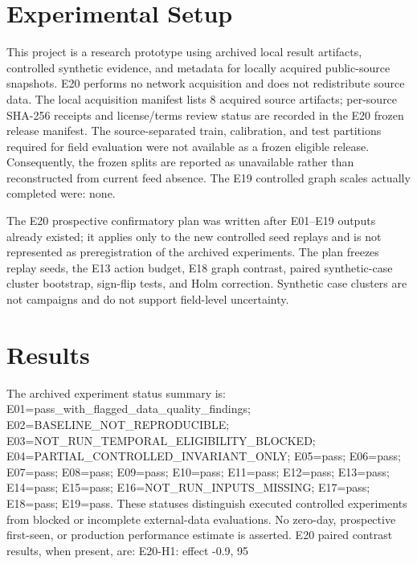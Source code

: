 \section{Experimental Setup}
This project is a research prototype using archived local result artifacts, controlled synthetic evidence, and metadata for locally acquired public-source snapshots. E20 performs no network acquisition and does not redistribute source data. The local acquisition manifest lists 8 acquired source artifacts; per-source SHA-256 receipts and license/terms review status are recorded in the E20 frozen release manifest. The source-separated train, calibration, and test partitions required for field evaluation were not available as a frozen eligible release. Consequently, the frozen splits are reported as unavailable rather than reconstructed from current feed absence. The E19 controlled graph scales actually completed were: none.

The E20 prospective confirmatory plan was written after E01--E19 outputs already existed; it applies only to the new controlled seed replays and is not represented as preregistration of the archived experiments. The plan freezes replay seeds, the E13 action budget, E18 graph contrast, paired synthetic-case cluster bootstrap, sign-flip tests, and Holm correction. Synthetic case clusters are not campaigns and do not support field-level uncertainty.

\section{Results}
The archived experiment status summary is: E01=pass_with_flagged_data_quality_findings; E02=BASELINE_NOT_REPRODUCIBLE; E03=NOT_RUN_TEMPORAL_ELIGIBILITY_BLOCKED; E04=PARTIAL_CONTROLLED_INVARIANT_ONLY; E05=pass; E06=pass; E07=pass; E08=pass; E09=pass; E10=pass; E11=pass; E12=pass; E13=pass; E14=pass; E15=pass; E16=NOT_RUN_INPUTS_MISSING; E17=pass; E18=pass; E19=pass. These statuses distinguish executed controlled experiments from blocked or incomplete external-data evaluations. No zero-day, prospective first-seen, or production performance estimate is asserted. E20 paired contrast results, when present, are: E20-H1: effect -0.9, 95%

